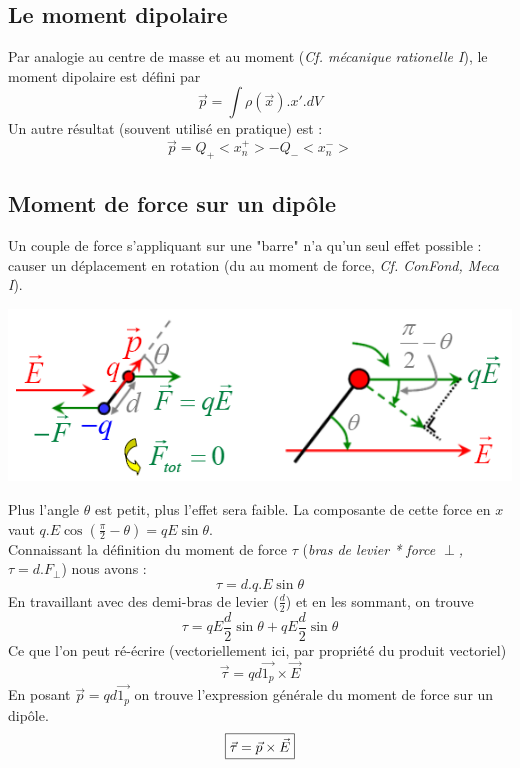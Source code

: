 \documentclass	[11pt, a4paper, openany]{book}
\begin{document}
\subsection{Le moment dipolaire}
Par analogie au centre de masse et au moment (\textit{Cf. mécanique rationelle I}), le moment dipolaire est défini par
\begin{equation}
\vec{p} = \int \rho (\vec{x}).x'.dV
\end{equation}
Un autre résultat (souvent utilisé en pratique) est : 
\begin{equation}
\vec{p} = Q_+ <x_n^+> - Q_-<x_n^->
\end{equation}

\newpage
\subsection{Moment de force sur un dipôle}
Un couple de force s'appliquant sur une "barre" n'a qu'un seul effet possible : causer un déplacement en rotation (du au moment de force, \textit{Cf. ConFond, Meca I}).

\begin{center}
\includegraphics[scale=0.6]{es/image11.png}
\end{center}
Plus l'angle $\theta$ est petit, plus l'effet sera faible.  La composante de cette force en $x$ vaut $q.E\cos(\frac{\pi}{2} - \theta) = qE\sin\theta$.\\
Connaissant la définition du moment de force $\tau$ (\textit{bras de levier * force $\perp$, $\tau = d.F_\perp$}) nous avons : \\
\begin{equation}
\tau = d.q.E\sin\theta
\end{equation}
En travaillant avec des demi-bras de levier ($\frac{d}{2}$) et en les sommant, on trouve
\begin{equation}
\tau = qE\frac{d}{2}\sin\theta + qE\frac{d}{2}\sin\theta
\end{equation}
Ce que l'on peut ré-écrire (vectoriellement ici, par propriété du produit vectoriel)
\begin{equation}
\vec{\tau} = qd\vec{1_p}\times \vec{E}
\end{equation}
En posant $\vec p = qd\vec{1_p}$ on trouve l'expression générale du moment de force sur un dipôle.
\begin{equation}
\fbox{$\vec{\tau} = \vec{p} \times \vec{E}$}
\end{equation}
\end{document}

